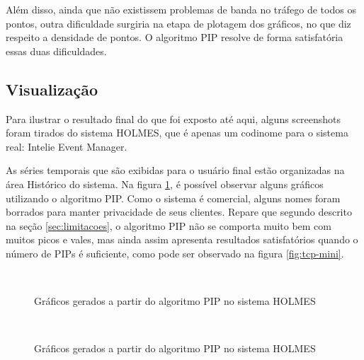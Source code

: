 Além disso, ainda que não existissem problemas de banda no tráfego de todos os pontos, outra dificuldade surgiria na etapa de plotagem dos gráficos, no que diz respeito a densidade de pontos. O algoritmo PIP resolve de forma satisfatória essas duas dificuldades.

\subsection{Visualização}
\label{sub:visualizacao}
Para ilustrar o resultado final do que foi exposto até aqui, alguns screenshots foram tirados do sistema HOLMES, que é apenas um codinome para o sistema real: Intelie Event Manager.

As séries temporais que são exibidas para o usuário final estão organizadas na área Histórico do sistema. Na figura \ref{fig:graf-mini}, é possível observar alguns gráficos utilizando o algoritmo PIP. Como o sistema é comercial, alguns nomes foram borrados para manter privacidade de seus clientes. Repare que segundo descrito na seção \ref{sec:limitacoes}, o algoritmo PIP não se comporta muito bem com muitos picos e vales, mas ainda assim apresenta resultados satisfatórios quando o número de PIPs é suficiente, como pode ser observado na figura \ref{fig:tcp-mini}.

\begin{figure}[htb!]
  \begin{center}
     \\
    \centering
    \caption{Gráficos gerados a partir do algoritmo PIP no sistema HOLMES}
    \label{fig:graf-mini}
  \end{center}
\end{figure}

\begin{figure}[htb!]
  \begin{center}
     \\
    \centering
    \caption{Gráficos gerados a partir do algoritmo PIP no sistema HOLMES}
    \label{fig:graf-big}
  \end{center}
\end{figure}

